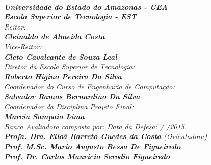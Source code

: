 \begin{spacing}{1.4}
\textit{\textbf{\\
Universidade do Estado do Amazonas - UEA\\
Escola Superior de Tecnologia - EST}}
\textit{\\
Reitor:\\
\textbf{Cleinaldo de Almeida Costa}\\
Vice-Reitor:\\ \textbf{Cleto Cavalcante de Souza Leal}}
\\
\textit{
Diretor da Escola Superior de Tecnologia:\\
\textbf{Roberto Higino Pereira Da Silva}}
\\
\textit{
Coordenador do Curso de Engenharia de Computação:\\
\textbf{Salvador Ramos Bernardino Da Silva}}
\\
\textit{
Coordenador da Disciplina Projeto Final:\\
\textbf{Marcia Sampaio Lima}}
\\[12pt]
\textit{
Banca Avaliadora composta por: \hfill Data da Defesa:  /  /2015.\\
}
\textit{
\textbf{Profa. Dra. Elloá Barreto Guedes da Costa} (Orientadora)\\
\textbf{Prof. M.Sc. Mario Augusto Bessa De Figueiredo}\\%
\textbf{Prof. Dr. Carlos Mauricio Serodio Figueiredo}
}
\ \ \\
 \begin{small}
\begin{center}
\end{center}
\end{small}
\end{spacing}
 \newpage
